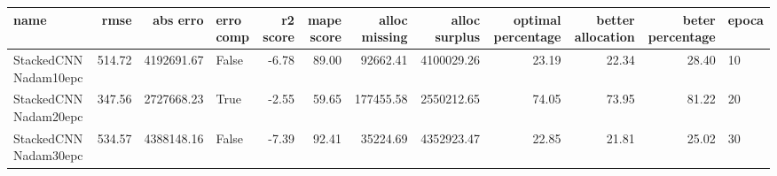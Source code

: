 \begin{tabular}{lrrlrrrrrrrl}
\toprule
name & rmse & abs erro & erro comp & r2 score & mape score & alloc missing & alloc surplus & optimal percentage & better allocation & beter percentage & epoca \\
\midrule
StackedCNN Nadam10epc & 514.72 & 4192691.67 & False & -6.78 & 89.00 & 92662.41 & 4100029.26 & 23.19 & 22.34 & 28.40 & 10 \\
StackedCNN Nadam20epc & 347.56 & 2727668.23 & True & -2.55 & 59.65 & 177455.58 & 2550212.65 & 74.05 & 73.95 & 81.22 & 20 \\
StackedCNN Nadam30epc & 534.57 & 4388148.16 & False & -7.39 & 92.41 & 35224.69 & 4352923.47 & 22.85 & 21.81 & 25.02 & 30 \\
\bottomrule
\end{tabular}

